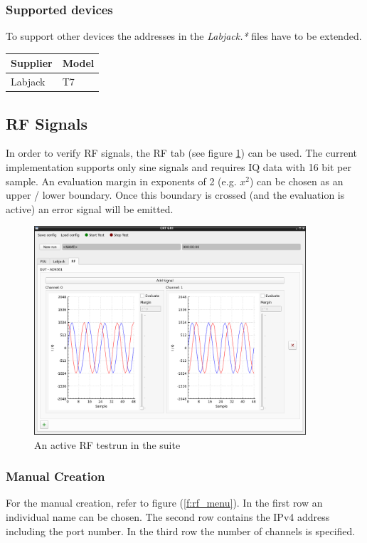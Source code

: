 \documentclass[10pt,a4paper]{article}
\begin{document}
		\subsubsection{Supported devices}
		To support other devices the addresses in the \textit{Labjack.*} files have to be extended.
	
		\begin{table}[H]
		\centering
		\begin{tabular}{ll}
		\toprule
		Supplier			& Model \\ \midrule
		Labjack				& T7 \\
		\bottomrule
		\end{tabular}			
		\end{table}	

	\newpage
	\subsection{RF Signals}	
	In order to verify RF signals, the RF tab (see figure \ref{f:rf_example}) can be used. The current implementation supports only sine signals and requires IQ data with 16 bit per sample. An evaluation margin in exponents of 2 (e.g. $x^2$) can be chosen as an upper / lower boundary. Once this boundary is crossed (and the evaluation is active) an error signal will be emitted.
		
		\begin{figure}[H]
\centering
\includegraphics[width=0.9\textwidth]{./6_RF_example.png}
\caption{An active RF testrun in the suite}
\label{f:rf_example}
		\end{figure}
	
		\subsubsection{Manual Creation}
		For the manual creation, refer to figure (\ref{f:rf_menu}). In the first row an individual name can be chosen. The second row contains the IPv4 address including the port number. In the third row the number of channels is specified.		
		
\end{document}
